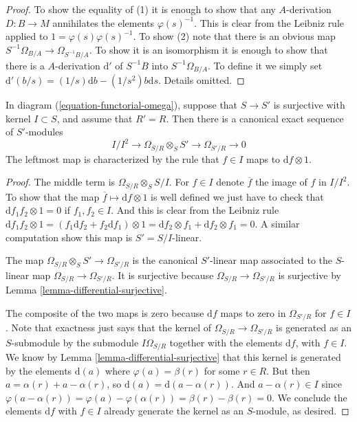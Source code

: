 \begin{proof}
To show the equality of (1) it is enough to show that any
$A$-derivation $D : B \to M$ annihilates the elements $\varphi(s)^{-1}$.
This is clear from the Leibniz rule applied to
$1 = \varphi(s) \varphi(s)^{-1}$.
To show (2) note that there is an obvious map
$S^{-1}\Omega_{B/A} \to \Omega_{S^{-1}B/A}$.
To show it is an isomorphism it is enough to show that
there is a $A$-derivation $\text{d}'$ of $S^{-1}B$ into $S^{-1}\Omega_{B/A}$.
To define it we simply set
$\text{d}'(b/s) = (1/s)\text{d}b - (1/s^2)b\text{d}s$.
Details omitted.
\end{proof}

\begin{lemma}
\label{lemma-differential-seq}
In diagram (\ref{equation-functorial-omega}),
suppose that $S \to S'$ is surjective with kernel $I \subset S$,
and assume that $R' = R$.
Then there is a canonical exact sequence of $S'$-modules
$$
I/I^2
\longrightarrow
\Omega_{S/R}\otimes_S S'
\longrightarrow
\Omega_{S'/R}
\longrightarrow
0
$$
The leftmost map is characterized by the rule that
$f \in I$ maps to $\text{d}f \otimes 1$.
\end{lemma}

\begin{proof}
The middle term is $\Omega_{S/R} \otimes_S S/I$.
For $f \in I$ denote $\overline{f}$ the image of $f$ in $I/I^2$.
To show that the map $\overline{f} \mapsto \text{d}f \otimes 1$
is well defined we just have to check that
$\text{d} f_1f_2 \otimes 1 = 0$ if $f_1, f_2 \in I$.
And this is clear from the Leibniz rule
$\text{d} f_1f_2 \otimes 1
=
(f_1 \text{d}f_2 + f_2 \text{d} f_1 )\otimes 1
=
\text{d}f_2 \otimes f_1 + \text{d}f_2 \otimes f_1
=
0$. A similar computation show this map is $S' = S/I$-linear.

\medskip\noindent
The map $\Omega_{S/R}\otimes_S S' \to \Omega_{S'/R}$
is the canonical $S'$-linear map associated to the
$S$-linear map $\Omega_{S/R} \to \Omega_{S'/R}$.
It is surjective because $\Omega_{S/R} \to \Omega_{S'/R}$
is surjective by Lemma \ref{lemma-differential-surjective}.

\medskip\noindent
The composite of the two maps is zero because
$\text{d}f$ maps to zero in $\Omega_{S'/R}$
for $f \in I$. Note that exactness just says that
the kernel of $\Omega_{S/R} \to \Omega_{S'/R}$
is generated as an $S$-submodule by the submodule $I\Omega_{S/R}$ together
with the elements $\text{d}f$, with $f \in I$. We know by
Lemma \ref{lemma-differential-surjective}
that this kernel is generated by the elements $\text{d}(a)$
where $\varphi(a) = \beta(r)$ for some $r \in R$.
But then $a = \alpha(r) + a - \alpha(r)$, so
$\text{d}(a) = \text{d}(a - \alpha(r))$. And
$a - \alpha(r) \in I$ since $\varphi(a - \alpha(r)) =
\varphi(a) - \varphi(\alpha(r)) = \beta(r) - \beta(r) = 0$.
We conclude the elements $\text{d}f$ with $f \in I$ already
generate the kernel as an $S$-module, as desired.
\end{proof}

